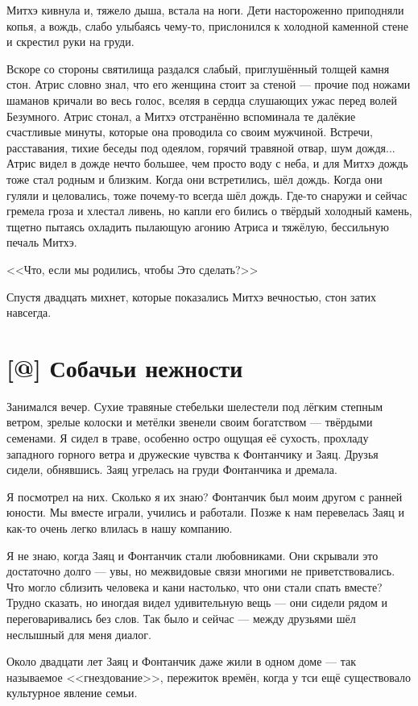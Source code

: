 Митхэ кивнула и, тяжело дыша, встала на ноги.
Дети настороженно приподняли копья, а вождь, слабо улыбаясь чему-то, прислонился к холодной каменной стене и скрестил руки на груди.

Вскоре со стороны святилища раздался слабый, приглушённый толщей камня стон.
Атрис словно знал, что его женщина стоит за стеной --- прочие под ножами шаманов кричали во весь голос, вселяя в сердца слушающих ужас перед волей Безумного.
Атрис стонал, а Митхэ отстранённо вспоминала те далёкие счастливые минуты, которые она проводила со своим мужчиной.
Встречи, расставания, тихие беседы под одеялом, горячий травяной отвар, шум дождя...
Атрис видел в дожде нечто большее, чем просто воду с неба, и для Митхэ дождь тоже стал родным и близким.
Когда они встретились, шёл дождь.
Когда они гуляли и целовались, тоже почему-то всегда шёл дождь.
Где-то снаружи и сейчас гремела гроза и хлестал ливень, но капли его бились о твёрдый холодный камень, тщетно пытаясь охладить пылающую агонию Атриса и тяжёлую, бессильную печаль Митхэ.

<<Что, если мы родились, чтобы Это сделать?>>

Спустя двадцать михнет, которые показались Митхэ вечностью, стон затих навсегда.

\section{[@] Собачьи нежности}

Занимался вечер.
Сухие травяные стебельки шелестели под лёгким степным ветром, зрелые колоски и метёлки звенели своим богатством --- твёрдыми семенами.
Я сидел в траве, особенно остро ощущая её сухость, прохладу западного горного ветра и дружеские чувства к Фонтанчику и Заяц.
Друзья сидели, обнявшись.
Заяц угрелась на груди Фонтанчика и дремала.

Я посмотрел на них.
Сколько я их знаю?
Фонтанчик был моим другом с ранней юности.
Мы вместе играли, учились и работали.
Позже к нам перевелась Заяц и как-то очень легко влилась в нашу компанию.

Я не знаю, когда Заяц и Фонтанчик стали любовниками.
Они скрывали это достаточно долго --- увы, но межвидовые связи многими не приветствовались.
Что могло сблизить человека и кани настолько, что они стали спать вместе?
Трудно сказать, но иногдая видел удивительную вещь --- они сидели рядом и переговаривались без слов.
Так было и сейчас --- между друзьями шёл неслышный для меня диалог.

Около двадцати лет Заяц и Фонтанчик даже жили в одном доме --- так называемое <<гнездование>>, пережиток времён, когда у тси ещё существовало культурное явление семьи.

